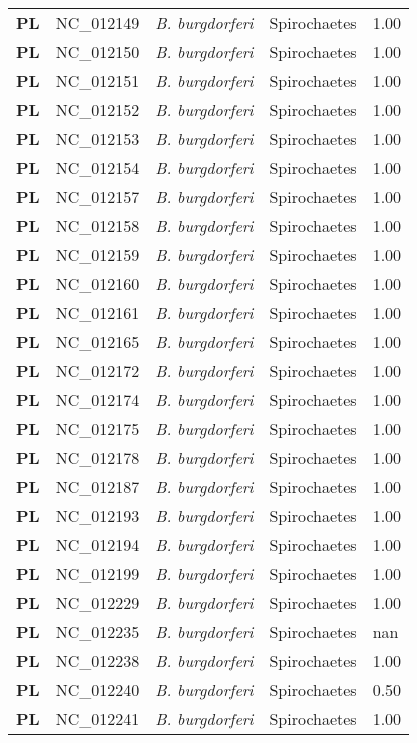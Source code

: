 \begin{adjustwidth}{-3cm}{2cm}
{\begin{supertabular}{>{\bfseries}l|p{0.1\textwidth}p{0.14\textwidth}l|l}
PL & NC\_012149 & \textit{B. burgdorferi} & Spirochaetes & 1.00\\
PL & NC\_012150 & \textit{B. burgdorferi} & Spirochaetes & 1.00\\
PL & NC\_012151 & \textit{B. burgdorferi} & Spirochaetes & 1.00\\
PL & NC\_012152 & \textit{B. burgdorferi} & Spirochaetes & 1.00\\
PL & NC\_012153 & \textit{B. burgdorferi} & Spirochaetes & 1.00\\
PL & NC\_012154 & \textit{B. burgdorferi} & Spirochaetes & 1.00\\
PL & NC\_012157 & \textit{B. burgdorferi} & Spirochaetes & 1.00\\
PL & NC\_012158 & \textit{B. burgdorferi} & Spirochaetes & 1.00\\
PL & NC\_012159 & \textit{B. burgdorferi} & Spirochaetes & 1.00\\
PL & NC\_012160 & \textit{B. burgdorferi} & Spirochaetes & 1.00\\
PL & NC\_012161 & \textit{B. burgdorferi} & Spirochaetes & 1.00\\
PL & NC\_012165 & \textit{B. burgdorferi} & Spirochaetes & 1.00\\
PL & NC\_012172 & \textit{B. burgdorferi} & Spirochaetes & 1.00\\
PL & NC\_012174 & \textit{B. burgdorferi} & Spirochaetes & 1.00\\
PL & NC\_012175 & \textit{B. burgdorferi} & Spirochaetes & 1.00\\
PL & NC\_012178 & \textit{B. burgdorferi} & Spirochaetes & 1.00\\
PL & NC\_012187 & \textit{B. burgdorferi} & Spirochaetes & 1.00\\
PL & NC\_012193 & \textit{B. burgdorferi} & Spirochaetes & 1.00\\
PL & NC\_012194 & \textit{B. burgdorferi} & Spirochaetes & 1.00\\
PL & NC\_012199 & \textit{B. burgdorferi} & Spirochaetes & 1.00\\
PL & NC\_012229 & \textit{B. burgdorferi} & Spirochaetes & 1.00\\
PL & NC\_012235 & \textit{B. burgdorferi} & Spirochaetes & nan\\
PL & NC\_012238 & \textit{B. burgdorferi} & Spirochaetes & 1.00\\
PL & NC\_012240 & \textit{B. burgdorferi} & Spirochaetes & 0.50\\
PL & NC\_012241 & \textit{B. burgdorferi} & Spirochaetes & 1.00\\

\end{supertabular}}
\end{adjustwidth}
